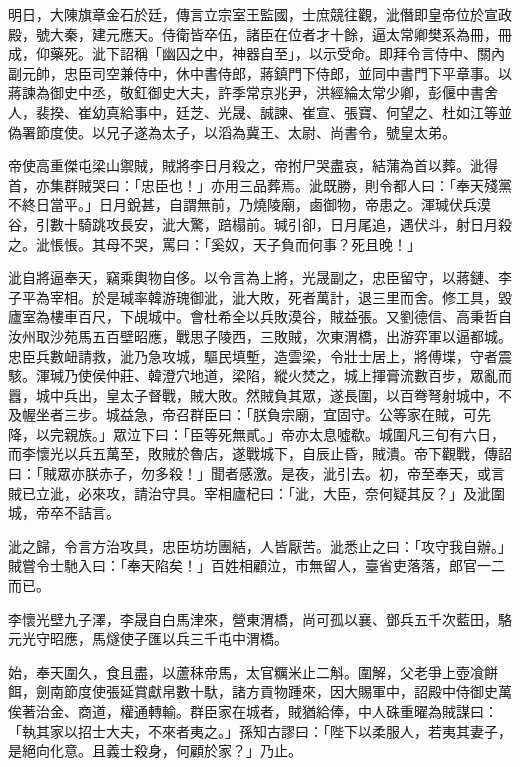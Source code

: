 \begin{pinyinscope}
 明日，大陳旗章金石於廷，傳言立宗室王監國，士庶競往觀，泚僭即皇帝位於宣政殿，號大秦，建元應天。侍衛皆卒伍，諸臣在位者才十餘，逼太常卿樊系為冊，冊成，仰藥死。泚下詔稱「幽囚之中，神器自至」，以示受命。即拜令言侍中、關內副元帥，忠臣司空兼侍中，休中書侍郎，蔣鎮門下侍郎，並同中書門下平章事。以蔣諫為御史中丞，敬釭御史大夫，許季常京兆尹，洪經綸太常少卿，彭偃中書舍人，裴揆、崔幼真給事中，廷芝、光晟、誠諫、崔宣、張寶、何望之、杜如江等並偽署節度使。以兄子遂為太子，以滔為冀王、太尉、尚書令，號皇太弟。



 帝使高重傑屯梁山禦賊，賊將李日月殺之，帝拊尸哭盡哀，結蒲為首以葬。泚得首，亦集群賊哭曰：「忠臣也！」亦用三品葬焉。泚既勝，則令都人曰：「奉天殘黨不終日當平。」日月銳甚，自謂無前，乃燒陵廟，鹵御物，帝患之。渾瑊伏兵漠谷，引數十騎跳攻長安，泚大驚，踣榻前。瑊引卻，日月尾追，遇伏斗，射日月殺之。泚悵悵。其母不哭，罵曰：「奚奴，天子負而何事？死且晚！」



 泚自將逼奉天，竊乘輿物自侈。以令言為上將，光晟副之，忠臣留守，以蔣鏈、李子平為宰相。於是瑊率韓游瑰御泚，泚大敗，死者萬計，退三里而舍。修工具，毀廬室為樓車百尺，下覘城中。會杜希全以兵敗漠谷，賊益張。又劉德信、高秉哲自汝州取沙苑馬五百壁昭應，戰思子陵西，三敗賊，次東渭橋，出游弈軍以逼都城。忠臣兵數衄請救，泚乃急攻城，驅民填塹，造雲梁，令壯士居上，將傅堞，守者震駭。渾瑊乃使侯仲莊、韓澄穴地道，梁陷，縱火焚之，城上揮膏流數百步，眾亂而囂，城中兵出，皇太子督戰，賊大敗。然賊負其眾，遂長圍，以百弮弩射城中，不及幄坐者三步。城益急，帝召群臣曰：「朕負宗廟，宜固守。公等家在賊，可先降，以完親族。」眾泣下曰：「臣等死無貳。」帝亦太息噓欷。城圍凡三旬有六日，而李懷光以兵五萬至，敗賊於魯店，遂戰城下，自辰止昏，賊潰。帝下觀戰，傳詔曰：「賊眾亦朕赤子，勿多殺！」聞者感激。是夜，泚引去。初，帝至奉天，或言賊已立泚，必來攻，請治守具。宰相廬杞曰：「泚，大臣，奈何疑其反？」及泚圍城，帝卒不詰言。



 泚之歸，令言方治攻具，忠臣坊坊團結，人皆厭苦。泚悉止之曰：「攻守我自辦。」賊嘗令士馳入曰：「奉天陷矣！」百姓相顧泣，市無留人，臺省吏落落，郎官一二而已。



 李懷光壁九子澤，李晟自白馬津來，營東渭橋，尚可孤以襄、鄧兵五千次藍田，駱元光守昭應，馬燧使子匯以兵三千屯中渭橋。



 始，奉天圍久，食且盡，以蘆秣帝馬，太官糲米止二斛。圍解，父老爭上壺飡餅餌，劍南節度使張延賞獻帛數十馱，諸方貢物踵來，因大賜軍中，詔殿中侍御史萬俟著治金、商道，權通轉輸。群臣家在城者，賊猶給俸，中人硃重曜為賊謀曰：「執其家以招士大夫，不來者夷之。」孫知古謬曰：「陛下以柔服人，若夷其妻子，是絕向化意。且義士殺身，何顧於家？」乃止。




\end{pinyinscope}
